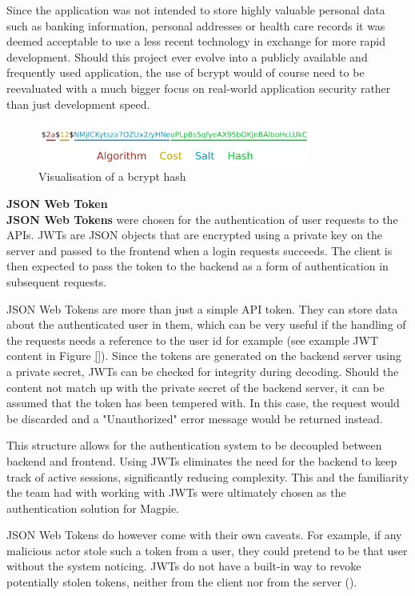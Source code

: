 Since the application was not intended to store highly valuable personal data
such as banking information, personal addresses or health care records it was
deemed acceptable to use a less recent technology in exchange for more rapid
development. Should this project ever evolve into a publicly available and
frequently used application, the use of bcrypt would of course need to be
reevaluated with a much bigger focus on real-world application security rather
than just development speed.

\begin{figure}[H]
  \centering{}
  \includegraphics[width=0.8\textwidth]{./images/bcrypt_hash.png}
  \caption{Visualisation of a bcrypt hash}
  \label{fig:bcrypt_hash}
\end{figure}

\label{jwt}\textbf{JSON Web Token}\\
\textbf{JSON Web Tokens} were chosen for the authentication of user requests to
the APIs. JWTs are JSON objects that are encrypted using a private key on the
server and passed to the frontend when a login requests succeeds. The client is
then expected to pass the token to the backend as a form of authentication in
subsequent requests.

JSON Web Tokens are more than just a simple API token. They can store data about
the authenticated user in them, which can be very useful if the handling of the
requests needs a reference to the user id for example (see example JWT content
in Figure \ref{}). Since the tokens are generated on the backend server using a
private secret, JWTs can be checked for integrity during decoding. Should the
content not match up with the private secret of the backend server, it can be
assumed that the token has been tempered with. In this case, the request would
be discarded and a "Unauthorized" error message would be returned instead.

This structure allows for the authentication system to be decoupled between
backend and frontend. Using JWTs eliminates the need for the backend to keep
track of active sessions, significantly reducing complexity. This and the
familiarity the team had with working with JWTs were ultimately chosen as the
authentication solution for Magpie.

JSON Web Tokens do however come with their own caveats. For example, if any
malicious actor stole such a token from a user, they could pretend to be that
user without the system noticing. JWTs do not have a built-in way to revoke
potentially stolen tokens, neither from the client nor from the server
(\cite{owasp_jwt_cheatsheet}).

